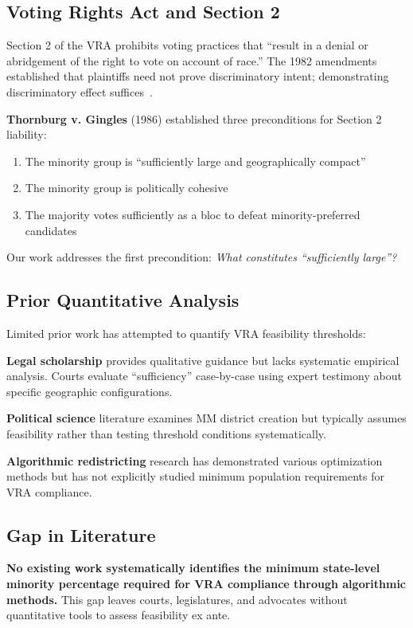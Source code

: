 \subsection{Voting Rights Act and Section 2}

Section 2 of the VRA prohibits voting practices that ``result in a denial or abridgement of the right to vote on account of race.'' The 1982 amendments established that plaintiffs need not prove discriminatory intent; demonstrating discriminatory effect suffices~\citep{vra1982}.

\textbf{Thornburg v. Gingles} (1986) established three preconditions for Section 2 liability:
\begin{enumerate}
    \item The minority group is ``sufficiently large and geographically compact''
    \item The minority group is politically cohesive
    \item The majority votes sufficiently as a bloc to defeat minority-preferred candidates
\end{enumerate}

Our work addresses the first precondition: \emph{What constitutes ``sufficiently large''?}

\subsection{Prior Quantitative Analysis}

Limited prior work has attempted to quantify VRA feasibility thresholds:

\textbf{Legal scholarship} provides qualitative guidance but lacks systematic empirical analysis. Courts evaluate ``sufficiency'' case-by-case using expert testimony about specific geographic configurations.

\textbf{Political science} literature examines MM district creation but typically assumes feasibility rather than testing threshold conditions systematically.

\textbf{Algorithmic redistricting} research has demonstrated various optimization methods but has not explicitly studied minimum population requirements for VRA compliance.

\subsection{Gap in Literature}

\textbf{No existing work systematically identifies the minimum state-level minority percentage required for VRA compliance through algorithmic methods.} This gap leaves courts, legislatures, and advocates without quantitative tools to assess feasibility ex ante.


